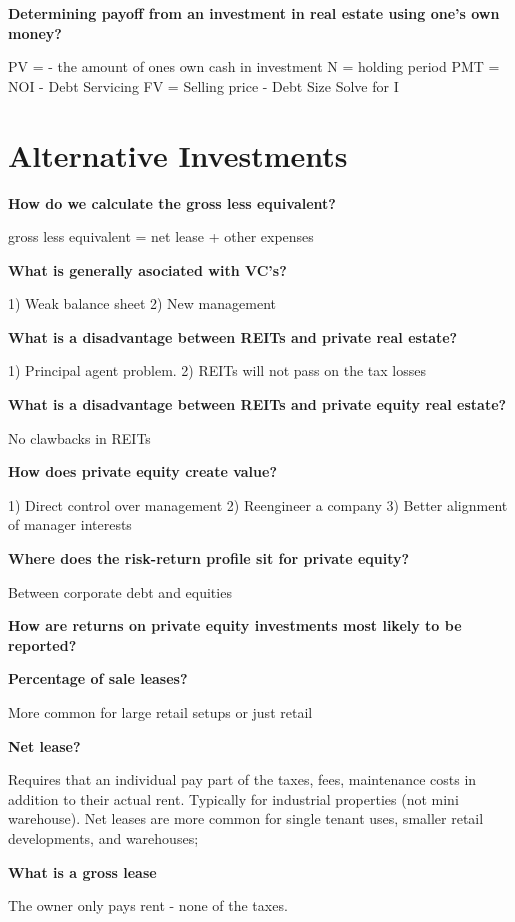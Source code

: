 \documentclass[12pt]{article}
\begin{document}
\newpage

\textbf{Determining payoff from an investment in real estate using one's own money?}

PV =  - the amount of ones own cash in investment
N = holding period
PMT = NOI - Debt Servicing
FV = Selling price - Debt Size
Solve for I

\section{Alternative Investments}

\textbf{How do we calculate the gross less equivalent?}

gross less equivalent = net lease + other expenses

\textbf{What is generally asociated with VC's?}

1) Weak balance sheet
2) New management

\textbf{What is a disadvantage between REITs and private real estate?}

1) Principal agent problem. 
2) REITs will not pass on the tax losses

\textbf{What is a disadvantage between REITs and private equity real estate?}

No clawbacks in REITs

\textbf{How does private equity create value?}

1) Direct control over management
2) Reengineer a company
3) Better alignment of manager interests

\textbf{Where does the risk-return profile sit for private equity?}

Between corporate debt and equities

\textbf{How are returns on private equity investments most likely to be reported?}



\textbf{Percentage of sale leases?}

More common for large retail setups or just retail

\textbf{Net lease?}

Requires that an individual pay part of the taxes, fees, maintenance costs in addition to their actual rent. Typically for industrial properties (not mini warehouse).  Net leases are more common for single tenant uses, smaller retail developments, and warehouses; 



\textbf{What is a gross lease}

The owner only pays rent - none of the taxes. 
\end{document}
